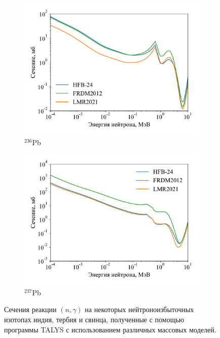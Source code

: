 \begin{figure}
\begin{subfigure}{0.48\textwidth}
    \includegraphics[width=\textwidth]{pics/cs_pb236.pdf}
    \caption{${}^{236}$Pb}
    \label{fig:ng_cs:236pb}
  \end{subfigure}
  \hfil
  \begin{subfigure}{0.48\textwidth}
    \centering
    \includegraphics[width=\textwidth]{pics/cs_pb237.pdf}
    \caption{${}^{237}$Pb}
    \label{fig:ng_cs:237pb}
  \end{subfigure}
  \caption{Сечения реакции $(n,\gamma)$ на некоторых нейтроноизбыточных изотопах индия, тербия и свинца, полученные с помощью программы TALYS с использованием различных массовых моделей.}
  \label{fig:ng_cs}
\end{figure}

